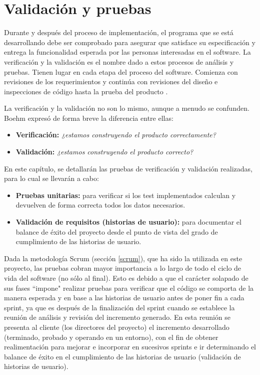 \chapter{Validación y pruebas} \label{valiprue}
Durante y después del proceso de implementación, el programa que se está desarrollando debe ser comprobado para asegurar que satisface su especificación y entrega la funcionalidad esperada por las personas interesadas en el software. La verificación y la validación es el nombre dado a estos procesos de análisis y pruebas. Tienen lugar en cada etapa del proceso del software. Comienza con revisiones de los requerimientos y continúa con revisiones del diseño e inspecciones de código hasta la prueba del producto \cite{sommerville}.

La verificación y la validación no son lo mismo, aunque a menudo se confunden. Boehm \cite{boehm} expresó de forma breve la diferencia entre ellas:

\begin{itemize}
\item \textbf{Verificación:} \textit{¿estamos construyendo el producto correctamente?}
\item \textbf{Validación:} \textit{¿estamos construyendo el producto correcto?}
\end{itemize}

En este capítulo, se detallarán las pruebas de verificación y validación realizadas, para lo cual se llevarán a cabo:
\begin{itemize}
\item \textbf{Pruebas unitarias:} para verificar si los test implementados calculan y devuelven de forma correcta todos los datos necesarios.
\item \textbf{Validación de requisitos (historias de usuario):} para documentar el balance de éxito del proyecto desde el punto de vista del grado de cumplimiento de las historias de usuario.
\end{itemize}

Dada la metodología Scrum (sección \ref{scrum}), que ha sido la utilizada en este proyecto, las pruebas cobran mayor importancia a lo largo de todo el ciclo de vida del software (no sólo al final). Esto es debido a que el carácter solapado de sus fases ``impone" \space realizar pruebas para verificar que el código se comporta de la manera esperada y en base a las historias de usuario antes de poner fin a cada sprint, ya que es después de la finalización del sprint cuando se establece la reunión de análisis y revisión del incremento generado. En esta reunión se presenta al cliente (los directores del proyecto) el incremento desarrollado (terminado, probado y operando en un entorno), con el fin de obtener realimentación para mejorar e incorporar en sucesivos sprints e ir determinando el balance de éxito en el cumplimiento de las historias de usuario (validación de historias de usuario).

